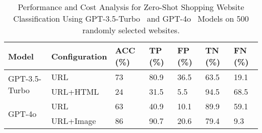 \begin{table}[t!]
\centering
\caption{Performance and Cost Analysis for Zero-Shot Shopping Website Classification Using GPT-3.5-Turbo~\citep{gpt35} and GPT-4o~\citep{openai2023gpt4} Models on 500 randomly selected websites.}
\footnotesize
\begin{tabular}{p{15mm} p{13mm} p{4mm} p{4.5mm} p{4.5mm} p{4.5mm} p{4mm} }
\toprule
{Model} & {Configuration} & {ACC (\%)} & {TP (\%)} & {FP (\%)} & {TN (\%)} & {FN (\%)}\\ 
\midrule
\multirow{2}{*}{{GPT-3.5-Turbo}} &
URL & 73 & 80.9 & 36.5 & 63.5 & 19.1  \\
& URL+HTML & 24 & 31.5 & 5.5 & 94.5 & 68.5 \\
\midrule

\multirow{2}{*}{{GPT-4o}} &
URL & 63 & 40.9 & 10.1 & 89.9 & 59.1 \\
& URL+Image & 86 & 90.7 & 20.6 & 79.4 & 9.3  \\

\bottomrule
\end{tabular}

\label{table:website_cls}
\end{table}



